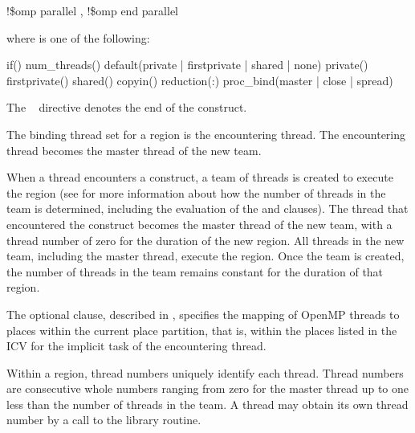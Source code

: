\begin{boxedcode}
!\$omp parallel \plc{[clause[ [},\plc{] clause] ... ]}
!\$omp end parallel
\end{boxedcode}

\begin{samepage}
where  is one of the following:

\begin{indentedcodelist}
if()
num\_threads()
default(private \textnormal{|} firstprivate \textnormal{|} shared \textnormal{|} none)
private()
firstprivate()
shared()
copyin()
reduction(:)
proc\_bind(master \textnormal{|} close \textnormal{|} spread)
\end{indentedcodelist}
\end{samepage}

The ~ directive denotes the end of the  construct.
\fortranspecificend

\binding
The binding thread set for a  region is the encountering thread. The 
encountering thread becomes the master thread of the new team.

\descr
When a thread encounters a  construct, a team of threads is created to 
execute the  region (see 
for more information about 
how the number of threads in the team is determined, including the evaluation of the 
and  clauses). The thread that encountered the  construct 
becomes the master thread of the new team, with a thread number of zero for the 
duration of the new  region. All threads in the new team, including the 
master thread, execute the region. Once the team is created, the number of threads in the 
team remains constant for the duration of that  region.

The optional  clause, described in 
, specifies the 
mapping of OpenMP threads to places within the current place partition, that is, within 
the places listed in the  ICV for the implicit task of the encountering 
thread.

Within a  region, thread numbers uniquely identify each thread. Thread 
numbers are consecutive whole numbers ranging from zero for the master thread up to 
one less than the number of threads in the team. A thread may obtain its own thread 
number by a call to the  library routine.

